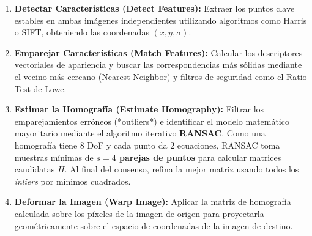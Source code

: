 \begin{enumerate}
    \item \textbf{Detectar Características (Detect Features):} Extraer los puntos clave estables en ambas imágenes independientes utilizando algoritmos como Harris o SIFT, obteniendo las coordenadas $(x, y, \sigma)$.
    \item \textbf{Emparejar Características (Match Features):} Calcular los descriptores vectoriales de apariencia y buscar las correspondencias más sólidas mediante el vecino más cercano (Nearest Neighbor) y filtros de seguridad como el Ratio Test de Lowe.
    \item \textbf{Estimar la Homografía (Estimate Homography):} Filtrar los emparejamientos erróneos (*outliers*) e identificar el modelo matemático mayoritario mediante el algoritmo iterativo \textbf{RANSAC}. Como una homografía tiene 8 DoF y cada punto da 2 ecuaciones, RANSAC toma muestras mínimas de \textbf{$s=4$ parejas de puntos} para calcular matrices candidatas $H$. Al final del consenso, refina la mejor matriz usando todos los \textit{inliers} por mínimos cuadrados.
    \item \textbf{Deformar la Imagen (Warp Image):} Aplicar la matriz de homografía calculada sobre los píxeles de la imagen de origen para proyectarla geométricamente sobre el espacio de coordenadas de la imagen de destino.
\end{enumerate}

